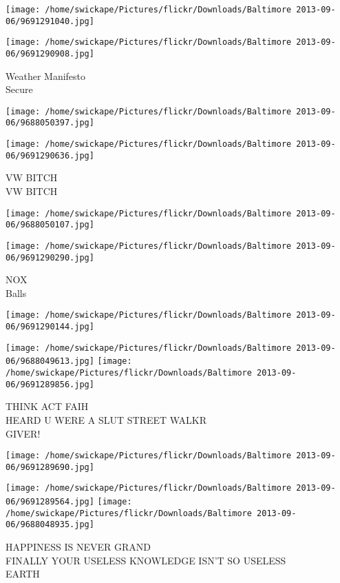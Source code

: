 \documentclass[10pt,letterpaper]{article}
\begin{document}
\texttt{[image: /home/swickape/Pictures/flickr/Downloads/Baltimore 2013-09-06/9691291040.jpg]}

\vspace{0.25in}
\texttt{[image: /home/swickape/Pictures/flickr/Downloads/Baltimore 2013-09-06/9691290908.jpg]}

Weather Manifesto\\
Secure
\pagebreak

\texttt{[image: /home/swickape/Pictures/flickr/Downloads/Baltimore 2013-09-06/9688050397.jpg]}

\vspace{0.25in}
\texttt{[image: /home/swickape/Pictures/flickr/Downloads/Baltimore 2013-09-06/9691290636.jpg]}

VW BITCH\\
VW BITCH
\pagebreak

\texttt{[image: /home/swickape/Pictures/flickr/Downloads/Baltimore 2013-09-06/9688050107.jpg]}

\vspace{0.25in}
\texttt{[image: /home/swickape/Pictures/flickr/Downloads/Baltimore 2013-09-06/9691290290.jpg]}

NOX\\
Balls
\pagebreak

\texttt{[image: /home/swickape/Pictures/flickr/Downloads/Baltimore 2013-09-06/9691290144.jpg]}

\vspace{0.25in}
\texttt{[image: /home/swickape/Pictures/flickr/Downloads/Baltimore 2013-09-06/9688049613.jpg]}
\texttt{[image: /home/swickape/Pictures/flickr/Downloads/Baltimore 2013-09-06/9691289856.jpg]}

THINK ACT FAIH\\
HEARD U WERE A SLUT STREET WALKR\\
GIVER!
\pagebreak

\texttt{[image: /home/swickape/Pictures/flickr/Downloads/Baltimore 2013-09-06/9691289690.jpg]}

\vspace{0.25in}
\texttt{[image: /home/swickape/Pictures/flickr/Downloads/Baltimore 2013-09-06/9691289564.jpg]}
\texttt{[image: /home/swickape/Pictures/flickr/Downloads/Baltimore 2013-09-06/9688048935.jpg]}

HAPPINESS IS NEVER GRAND\\
FINALLY YOUR USELESS KNOWLEDGE ISN'T SO USELESS\\
EARTH
\pagebreak
\end{document}

